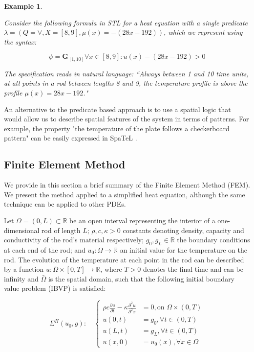 \documentclass{article}
\newtheorem{example}{Example}
\newcommand*{\R}{\mathbb{R}}
\newcommand{\Always}{\mathbf{G}}
\begin{document}
\begin{example}
    \label{ex:stl}

    Consider the following formula in STL for a heat equation with a single predicate
    $\lambda = (Q = \forall, X = [8, 9], \mu(x) = -(28x - 192))$, which we 
    represent using the syntax:

    \begin{equation}
        \psi = \Always_{[1,10]} \forall x \in [8,9] : u(x) - (28x - 192) > 0
    \end{equation}

    The specification reads in natural language: ``Always between 1 and 10 time
    units, at all points in a rod between lengths 8 and 9, the temperature
    profile is above the profile $\mu(x) = 28x - 192$."

\end{example}

An alternative to the predicate based approach is to use a spatial logic that
would allow us to describe spatial features of the system in terms of patterns.
For example, the property "the temperature of the plate follows a checkerboard
pattern" can be easily expressed in SpaTeL \cite{iman's work}.

\subsection{Finite Element Method}
\label{sub:Finite Element Method}

We provide in this section a brief summary of the Finite Element Method (FEM).
We present the method applied
to a simplified heat equation, although the same technique can be applied to other
PDEs.

Let $\Omega = (0, L) \subset \R$ be an open interval representing the interior
of a one-dimensional rod of length $L$; $\rho, c, \kappa > 0$ 
constants denoting density, capacity and conductivity of the rod's material respectively;
$g_0, g_L \in \R$ the boundary conditions at each end of the rod; and $u_0 :
\Omega \rightarrow \R$ an initial value for the temperature on the rod. 
The evolution of the temperature at
each point in the rod can be described by a function $u : \bar \Omega \times [0,
T] \rightarrow \R$, where $T > 0$ denotes the final time and can be infinity and
$\bar \Omega$ is the spatial domain, such that the following initial boundary
value problem (IBVP) is satisfied:

\begin{equation}\label{eq:pde}
    \Sigma^{H}(u_0, g) : \quad \left \{
    \begin{aligned}
        \rho c \frac{\partial u}{\partial t} - \kappa \frac{\partial^2
        u}{\partial^2 x} &= 0, \text{on } \Omega \times (0, T) \\
        u(0, t) &= g_0, \forall t \in (0, T) \\
        u(L, t) &= g_L, \forall t \in (0, T) \\
        u(x, 0) &= u_0(x), \forall x \in \Omega
    \end{aligned}
    \right.
\end{equation}
\end{document}
